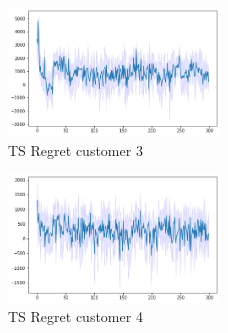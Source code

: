 \begin{multicols}{2}
    \begin{figure}[H]
        \begin{center}
        \includegraphics[width=0.5\textwidth]{img/ts7_3regret.png}
        \caption{TS Regret customer 3}
        \label{fig:Regret73}
        \end{center}
    \end{figure}
    \columnbreak
    \begin{figure}[H]
        \begin{center}
        \includegraphics[width=0.5\textwidth]{img/ts7_4regret.png}
        \caption{TS Regret customer 4}
        \label{fig:Regret74}
        \end{center}
    \end{figure}
\end{multicols}

